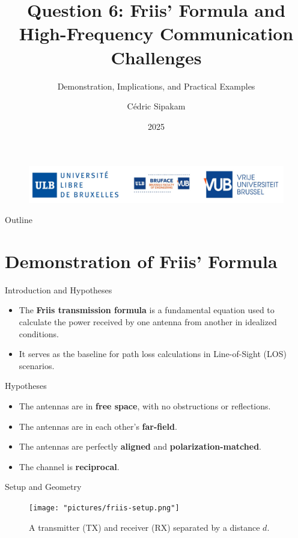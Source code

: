 \documentclass{beamer}
\title[Friis' Formula \& High-Frequency Challenges]{Question 6: Friis' Formula and High-Frequency Communication Challenges}
\subtitle{Demonstration, Implications, and Practical Examples}
\author{Cédric Sipakam}
\institute{ULB | VUB \\
	\vspace{1.5em}
	ELEC-H415: Communication Channels}
\date{2025}
\begin{document}
	\begin{frame}
		\begin{figure}
			\centering
			\includegraphics[width=0.7\linewidth]{pictures/logos}
		\end{figure}
		\titlepage
	\end{frame}
	
	\begin{frame}{Outline}
		\tableofcontents
	\end{frame}
	
	\section{Demonstration of Friis' Formula}
	
	\begin{frame}{Introduction and Hypotheses}
		\begin{itemize}
			\item The \textbf{Friis transmission formula} is a fundamental equation used to calculate the power received by one antenna from another in idealized conditions.
			\item It serves as the baseline for path loss calculations in Line-of-Sight (LOS) scenarios.
		\end{itemize}
		\begin{block}{Hypotheses}
			\begin{itemize}
				\item The antennas are in \textbf{free space}, with no obstructions or reflections.
				\item The antennas are in each other's \textbf{far-field}.
				\item The antennas are perfectly \textbf{aligned} and \textbf{polarization-matched}.
				\item The channel is \textbf{reciprocal}.
			\end{itemize}
		\end{block}
	\end{frame}
	
	\begin{frame}{Setup and Geometry}
		\begin{figure}
			\centering
			\texttt{[image: "pictures/friis-setup.png"]}
			\caption{A transmitter (TX) and receiver (RX) separated by a distance $d$.}
		\end{figure}
	\end{frame}
	
\end{document}

